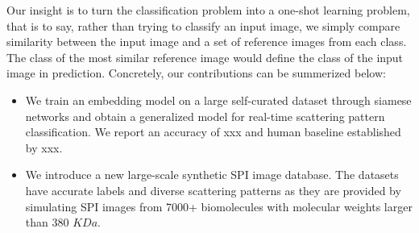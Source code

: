 Our insight is to turn the classification problem into a one-shot learning
problem, that is to say, rather than trying to classify an input image, we
simply compare similarity between the input image and a set of reference images
from each class.  The class of the most similar reference image would define the
class of the input image in prediction. Concretely, our contributions can be
summerized below:

\begin{itemize}

    \item We train an embedding model on a large self-curated dataset through
    siamese networks and obtain a generalized model for real-time scattering
    pattern classification.  We report an accuracy of {\color{red} xxx} and
    human baseline established by {\color{red} xxx}.

    \item We introduce a new large-scale synthetic SPI image database.  The
    datasets have accurate labels and diverse scattering patterns as they are
    provided by simulating SPI images from {\color{red} 7000+} biomolecules with
    molecular weights larger than 380 $KDa$.  

\end{itemize}





